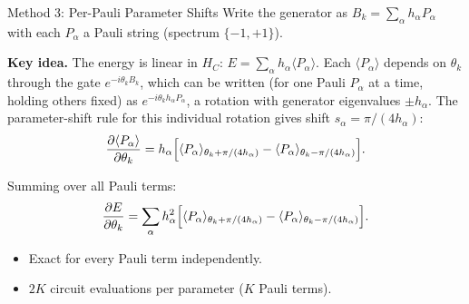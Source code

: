 \documentclass{beamer}
\begin{document}

\begin{frame}{Method 3: Per-Pauli Parameter Shifts}
Write the generator as $B_k = \sum_\alpha h_\alpha P_\alpha$
with each $P_\alpha$ a Pauli string (spectrum $\{-1,+1\}$).

\medskip
\textbf{Key idea.}  The energy is linear in $H_C$:
$E = \sum_\alpha h_\alpha\langle P_\alpha\rangle$.
Each $\langle P_\alpha\rangle$ depends on $\theta_k$ through the
gate $e^{-i\theta_k B_k}$, which can be written (for one Pauli
$P_\alpha$ at a time, holding others fixed) as
$e^{-i\theta_k h_\alpha P_\alpha}$, a rotation with generator
eigenvalues $\pm h_\alpha$.  The parameter-shift rule for this
individual rotation gives shift $s_\alpha = \pi/(4h_\alpha)$:
\[
\frac{\partial\langle P_\alpha\rangle}{\partial\theta_k}
= h_\alpha\Bigl[\langle P_\alpha\rangle_{\theta_k+\pi/(4h_\alpha)}
              - \langle P_\alpha\rangle_{\theta_k-\pi/(4h_\alpha)}\Bigr].
\]

Summing over all Pauli terms:
\[
\frac{\partial E}{\partial\theta_k}
= \sum_\alpha h_\alpha^2
\Bigl[\langle P_\alpha\rangle_{\theta_k+\pi/(4h_\alpha)}
    - \langle P_\alpha\rangle_{\theta_k-\pi/(4h_\alpha)}\Bigr].
\]

\begin{itemize}
\item[\textbf{+}] Exact for every Pauli term independently.
\item[\textbf{--}] $2K$ circuit evaluations per parameter ($K$ Pauli terms).
\end{itemize}
\end{frame}

\end{document}
